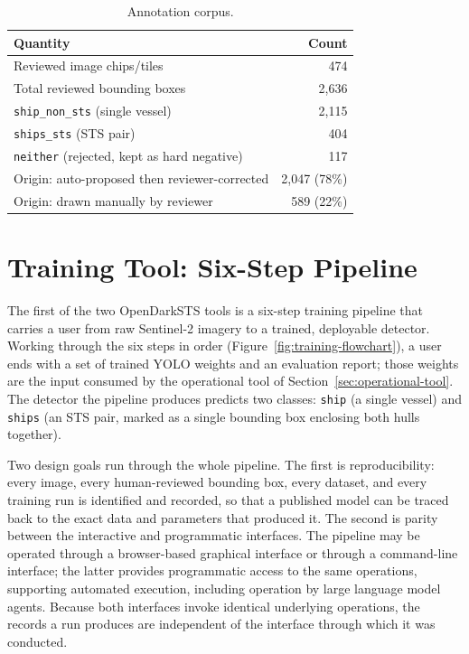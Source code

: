\documentclass[10pt, letterpaper, twocolumn]{article}
\begin{document}
\begin{table}[h]
\caption{Annotation corpus.}
\label{tab:annotation-corpus}
\begin{tabular}{lr}
\toprule
\textbf{Quantity} & \textbf{Count} \\
\midrule
Reviewed image chips/tiles                 & 474 \\
Total reviewed bounding boxes              & 2{,}636 \\
\quad \texttt{ship\_non\_sts} (single vessel)       & 2{,}115 \\
\quad \texttt{ships\_sts} (STS pair)                 & 404 \\
\quad \texttt{neither} (rejected, kept as hard negative) & 117 \\
Origin: auto-proposed then reviewer-corrected & 2{,}047 (78\%) \\
Origin: drawn manually by reviewer          & 589 (22\%) \\
\bottomrule
\end{tabular}
\end{table}



\section{Training Tool: Six-Step Pipeline}
\label{sec:training-tool}

The first of the two OpenDarkSTS tools is a six-step training pipeline that carries a user from raw Sentinel-2 imagery to a trained, deployable detector. Working through the six steps in order (Figure~\ref{fig:training-flowchart}), a user ends with a set of trained YOLO weights and an evaluation report; those weights are the input consumed by the operational tool of Section~\ref{sec:operational-tool}. The detector the pipeline produces predicts two classes: \texttt{ship} (a single vessel) and \texttt{ships} (an STS pair, marked as a single bounding box enclosing both hulls together).

Two design goals run through the whole pipeline. The first is reproducibility: every image, every human-reviewed bounding box, every dataset, and every training run is identified and recorded, so that a published model can be traced back to the exact data and parameters that produced it. The second is parity between the interactive and programmatic interfaces. The pipeline may be operated through a browser-based graphical interface or through a command-line interface; the latter provides programmatic access to the same operations, supporting automated execution, including operation by large language model agents. Because both interfaces invoke identical underlying operations, the records a run produces are independent of the interface through which it was conducted.
\end{document}
